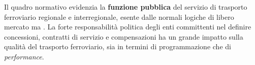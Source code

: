 \documentclass[12pt,italian]{report}
\begin{document}
	Il quadro normativo evidenzia la \textbf{funzione pubblica} del servizio di trasporto ferroviario regionale e interregionale, esente dalle normali logiche di libero mercato ma .
	La forte responsabilità politica degli enti committenti nel definire concessioni, contratti di servizio e compensazioni ha un grande impatto sulla qualità del trasporto ferroviario, sia in termini di programmazione che di \textit{performance}.

	\printbibliography
\end{document}
